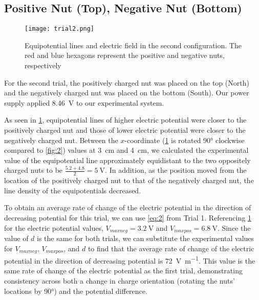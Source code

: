 \documentclass[10pt,journal,twoside]{IEEEtran}
\begin{document}
\subsection{Positive Nut (Top), Negative Nut (Bottom)}
\begin{figure}
\begin{center}
\texttt{[image: trial2.png]} %
\end{center}
\caption{Equipotential lines and electric field in the second configuration. The red and blue hexagons represent the positive and negative nuts, respectively}
\label{fig:3}
\end{figure}
For the second trial, the positively charged nut was placed on the top (North) and the negatively charged nut was placed on the bottom (South). Our power supply applied \qty{8.46}{\volt} to our experimental system.

As seen in \cref{fig:3}, equipotential lines of higher electric potential were closer to the positively charged nut and those of lower electric potential were closer to the negatively charged nut. Between the $x$-coordinate (\cref{fig:3} is rotated \ang{90} clockwise compared to \cref{fig:2}) values at \qty{3}{\centi\meter} and \qty{4}{\centi\meter}, we calculated the experimental value of the equipotential line approximately equidistant to the two oppositely charged nuts to be $\frac{5.2+4.8}{2}=\qty{5}{\volt}$. In addition, as the position moved from the location of the positively charged nut to that of the negatively charged nut, the line density of the equipotentials decreased. 

To obtain an average rate of change of the electric potential in the direction of decreasing potential for this trial, we can use \cref{eq:2} from Trial 1. Referencing \cref{fig:3} for the electric potential values, $V_{maxneg} = \qty{3.2}{\volt}$ and $V_{maxpos} = \qty{6.8}{\volt}$. Since the value of $d$ is the same for both trials, we can substitute the experimental values for $V_{maxneg}$, $V_{maxpos}$, and $d$ to find that the average rate of change of the electric potential in the direction of decreasing potential is \qty{72}{\volt\per\meter}. This value is the same rate of change of the electric potential as the first trial, demonstrating consistency across both a change in charge orientation (rotating the nuts’ locations by \ang{90}) and the potential difference.
\end{document}
